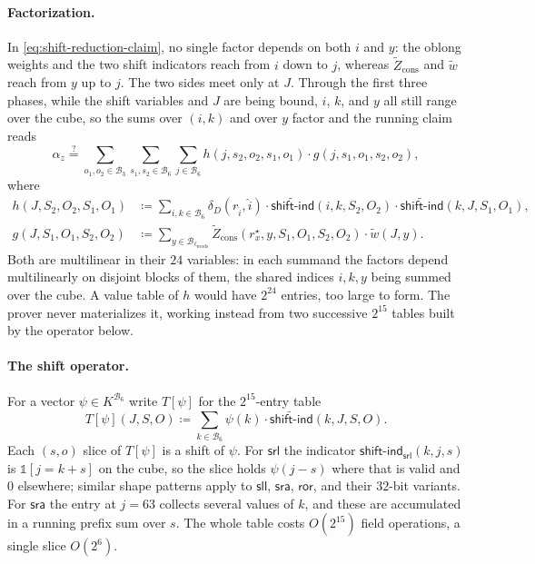 \documentclass{article}
\theoremstyle{definition}
\newcommand*{\mle}{\widetilde}
\newcommand{\BB}{\mathcal{B}}
\begin{document}
\paragraph{Factorization.}
In \eqref{eq:shift-reduction-claim}, no single factor depends on both $i$ and $y$: the oblong weights and the two shift indicators reach from $i$ down to $j$, whereas $\mle{Z}_\text{cons}$ and $\mle{w}$ reach from $y$ up to $j$. The two sides meet only at $J$. Through the first three phases, while the shift variables and $J$ are being bound, $i$, $k$, and $y$ all still range over the cube, so the sums over $(i, k)$ and over $y$ factor and the running claim reads
\[
  \alpha_z \stackrel{?}{=} \sum_{o_1, o_2 \in \BB_3} \sum_{s_1, s_2 \in \BB_6} \sum_{j \in \BB_6} h(j, s_2, o_2, s_1, o_1) \cdot g(j, s_1, o_1, s_2, o_2),
\]
where
\begin{align*}
  h(J, S_2, O_2, S_1, O_1) &\coloneqq \sum_{i, k \in \BB_6} \delta_D(r_{\widehat{i}}, \widehat{i}) \cdot \mle{\textsf{shift-ind}}(i, k, S_2, O_2) \cdot \mle{\textsf{shift-ind}}(k, J, S_1, O_1), \\
  g(J, S_1, O_1, S_2, O_2) &\coloneqq \sum_{y \in \BB_{\ell_\text{words}}} \mle{Z}_\text{cons}(r^\star_x, y, S_1, O_1, S_2, O_2) \cdot \mle{w}(J, y).
\end{align*}
Both are multilinear in their $24$ variables: in each summand the factors depend multilinearly on disjoint blocks of them, the shared indices $i, k, y$ being summed over the cube. A value table of $h$ would have $2^{24}$ entries, too large to form. The prover never materializes it, working instead from two successive $2^{15}$ tables built by the operator below.

\paragraph{The shift operator.}
For a vector $\psi \in K^{\BB_6}$ write $T[\psi]$ for the $2^{15}$-entry table
\[
  T[\psi](J, S, O) \coloneqq \sum_{k \in \BB_6} \psi(k) \cdot \mle{\textsf{shift-ind}}(k, J, S, O).
\]
Each $(s, o)$ slice of $T[\psi]$ is a shift of $\psi$. For $\textsf{srl}$ the indicator $\textsf{shift-ind}_\textsf{srl}(k, j, s)$ is $\mathbb{1}[j = k + s]$ on the cube, so the slice holds $\psi(j - s)$ where that is valid and $0$ elsewhere; similar shape patterns apply to $\textsf{sll}$, $\textsf{sra}$, $\textsf{ror}$, and their $32$-bit variants. For $\textsf{sra}$ the entry at $j = 63$ collects several values of $k$, and these are accumulated in a running prefix sum over $s$. The whole table costs $O(2^{15})$ field operations, a single slice $O(2^6)$.
\end{document}
